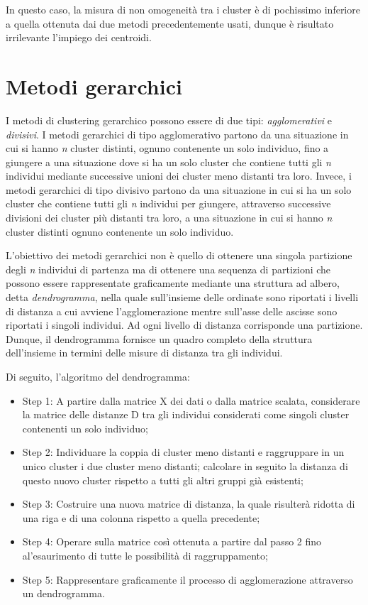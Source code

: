 In questo caso, la misura di non omogeneità tra i cluster è di pochissimo inferiore a quella ottenuta dai due metodi precedentemente usati, dunque è risultato irrilevante l'impiego dei centroidi.

\section{Metodi gerarchici}\label{cap5.2}

I metodi di clustering gerarchico possono essere di due tipi: \textit{agglomerativi} e \textit{divisivi}. I metodi gerarchici di tipo agglomerativo partono da una situazione in cui si hanno \textit{n} cluster distinti, ognuno contenente un solo individuo, fino a giungere a una situazione dove si ha un solo cluster che contiene tutti gli \textit{n} individui mediante successive unioni dei cluster meno distanti tra loro. Invece, i metodi gerarchici di tipo divisivo partono da una situazione in cui si ha un solo cluster che contiene tutti gli \textit{n} individui per giungere, attraverso successive divisioni dei cluster più distanti tra loro, a una situazione in cui si hanno \textit{n} cluster distinti ognuno contenente un solo individuo.

L'obiettivo dei metodi gerarchici non è quello di ottenere una singola partizione degli \textit{n} individui di partenza ma di ottenere una sequenza di partizioni che possono essere rappresentate graficamente mediante una struttura ad albero, detta \textit{dendrogramma}, nella quale sull'insieme delle ordinate sono riportati i livelli di distanza a cui avviene l'agglomerazione mentre sull'asse delle ascisse sono riportati i singoli individui. Ad ogni livello di distanza corrisponde una partizione. Dunque, il dendrogramma fornisce un quadro completo della struttura dell'insieme in termini delle misure di distanza tra gli individui.

Di seguito, l'algoritmo del dendrogramma:

\begin{itemize}
    \item Step 1: A partire dalla matrice X dei dati o dalla matrice scalata, considerare la matrice delle distanze D tra gli individui considerati come singoli cluster contenenti un solo individuo;
    \item Step 2: Individuare la coppia di cluster meno distanti e raggruppare in un unico cluster i due cluster meno distanti; calcolare in seguito la distanza di questo nuovo cluster rispetto a tutti gli altri gruppi già esistenti;
    \item Step 3: Costruire una nuova matrice di distanza, la quale risulterà ridotta di una riga e di una colonna rispetto a quella precedente;
    \item Step 4: Operare sulla matrice così ottenuta a partire dal passo 2 fino al'esaurimento di tutte le possibilità di raggruppamento;
    \item Step 5: Rappresentare graficamente il processo di agglomerazione attraverso un dendrogramma.
\end{itemize}

